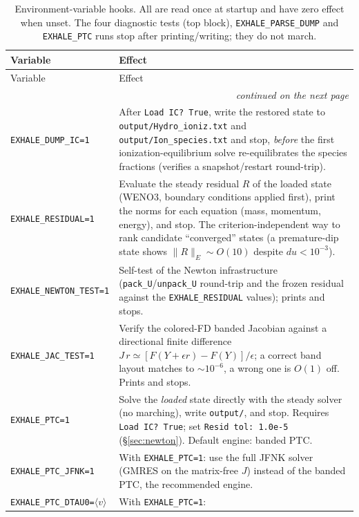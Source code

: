\documentclass[english,a4paper]{my_memo}
\begin{document}
{\small
\begin{longtable}{@{}lp{10.2cm}@{}}
\caption{Environment-variable hooks. All are read once at startup and have
zero effect when unset. The four diagnostic tests (top block),
\texttt{EXHALE\_PARSE\_DUMP} and \texttt{EXHALE\_PTC} runs stop after
printing/writing; they do not march.}
\label{tab:env}\\
\toprule
Variable & Effect \\
\midrule
\endfirsthead
\toprule
Variable & Effect \\
\midrule
\endhead
\midrule
\multicolumn{2}{r}{\emph{continued on the next page}}\\
\endfoot
\bottomrule
\endlastfoot
\texttt{EXHALE\_DUMP\_IC=1} & After \texttt{Load IC?\ True}, write the restored
  state to \texttt{output/Hydro\_ioniz.txt} and
  \texttt{output/Ion\_species.txt} and stop, \emph{before} the first
  ionization-equilibrium solve re-equilibrates the species fractions
  (verifies a snapshot/restart round-trip). \\
\texttt{EXHALE\_RESIDUAL=1} & Evaluate the steady residual $R$ of the loaded
  state (WENO3, boundary conditions applied first), print the norms
  for each equation (mass, momentum, energy), and stop. The criterion-independent way to
  rank candidate ``converged'' states (a premature-dip state shows
  $\|R\|_E\sim O(10)$ despite $du<10^{-3}$). \\
\texttt{EXHALE\_NEWTON\_TEST=1} & Self-test of the Newton infrastructure
  (\texttt{pack\_U}/\texttt{unpack\_U} round-trip and the frozen residual
  against the \texttt{EXHALE\_RESIDUAL} values); prints and stops. \\
\texttt{EXHALE\_JAC\_TEST=1} & Verify the colored-FD banded Jacobian against a
  directional finite difference $J\,r\simeq[F(Y+\epsilon r)-F(Y)]/\epsilon$;
  a correct band layout matches to $\sim10^{-6}$, a wrong one is $O(1)$ off.
  Prints and stops. \\
\midrule
\texttt{EXHALE\_PTC=1} & Solve the \emph{loaded} state directly with the steady
  solver (no marching), write \texttt{output/}, and stop. Requires
  \texttt{Load IC?\ True}; set \texttt{Resid tol:\ 1.0e-5}
  (\S\ref{sec:newton}). Default engine: banded
  PTC. \\
\texttt{EXHALE\_PTC\_JFNK=1} & With \texttt{EXHALE\_PTC=1}: use the full JFNK
  solver (GMRES on the matrix-free $J$) instead of the banded PTC,
  the recommended engine. \\
\texttt{EXHALE\_PTC\_DTAU0=}$\langle v\rangle$ & With \texttt{EXHALE\_PTC=1}:

\end{longtable}}
\end{document}
